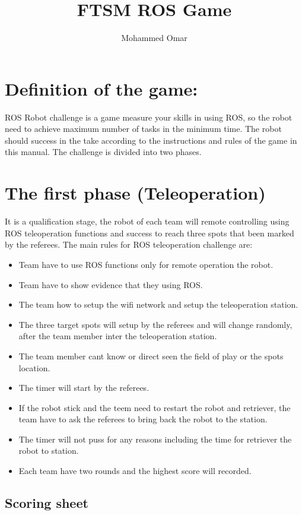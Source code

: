 \documentclass[10pt,a4paper]{article}
\author{Mohammed Omar}
\title{FTSM ROS Game}
\begin{document}
	\section{Definition of the game:}
		ROS Robot challenge is a game measure your skills in using ROS, so the robot need to achieve maximum number of tasks in the minimum time. The robot should success in the take according to the instructions and rules of the game in this manual. The challenge is divided into two phases.
	\section{The first phase (Teleoperation)}
		
		It is a qualification stage, the robot of each team will remote controlling using ROS teleoperation functions and success to reach three spots that been marked by the referees.		
		The main rules for ROS teleoperation challenge are:
		\begin{itemize}
			\item Team have to use ROS functions only for remote operation the robot.
			\item Team have to show evidence that they using ROS. 
			\item The team how to setup the wifi network and setup the teleoperation station.
			\item The three target spots will setup by the referees and will change randomly, after the team member inter the teleoperation station.
			\item The team member cant know or direct seen the field of play or the spots location.
			\item The timer will start by the referees.
			\item If the robot stick and the teem need to restart the robot and retriever, the team have to ask the referees to bring back the robot to the station.
			\item The timer will not puss for any reasons including the time for retriever the robot to station.
			\item Each team have two rounds and the highest score will recorded.
		\end{itemize}
		
		\subsection{Scoring sheet}
		
\end{document}
